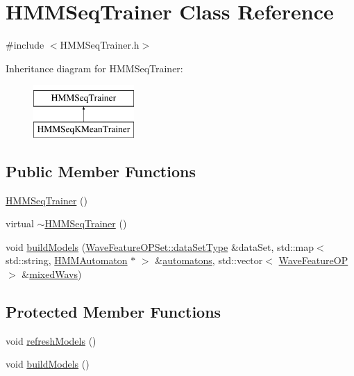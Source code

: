 \hypertarget{class_h_m_m_seq_trainer}{\section{H\+M\+M\+Seq\+Trainer Class Reference}
\label{class_h_m_m_seq_trainer}
}


{\ttfamily \#include $<$H\+M\+M\+Seq\+Trainer.\+h$>$}

Inheritance diagram for H\+M\+M\+Seq\+Trainer\+:\begin{figure}[H]
\begin{center}
\leavevmode
\includegraphics[height=2.000000cm]{class_h_m_m_seq_trainer}
\end{center}
\end{figure}
\subsection*{Public Member Functions}
\begin{DoxyCompactItemize}
\item 
\hyperlink{class_h_m_m_seq_trainer_a7057cd2041fd9a458b1f8e8f930bcaf8}{H\+M\+M\+Seq\+Trainer} ()
\item 
virtual \hyperlink{class_h_m_m_seq_trainer_ade6cb6a33af96d8f610276f86bceee09}{$\sim$\+H\+M\+M\+Seq\+Trainer} ()
\item 
void \hyperlink{class_h_m_m_seq_trainer_a391d1fe69c103b901cabc4c8d44d652c}{build\+Models} (\hyperlink{class_wave_feature_o_p_set_a7145e9463a1fb85ce4c239552bf4e8e0}{Wave\+Feature\+O\+P\+Set\+::data\+Set\+Type} \&data\+Set, std\+::map$<$ std\+::string, \hyperlink{class_h_m_m_automaton}{H\+M\+M\+Automaton} $\ast$ $>$ \&\hyperlink{class_h_m_m_seq_trainer_a70439ad48e64f17d74cdc968effb467f}{automatons}, std\+::vector$<$ \hyperlink{class_wave_feature_o_p}{Wave\+Feature\+O\+P} $>$ \&\hyperlink{class_h_m_m_seq_trainer_a74e6e47e0a794b07e0971cc482ebb5b3}{mixed\+Wavs})
\end{DoxyCompactItemize}
\subsection*{Protected Member Functions}
\begin{DoxyCompactItemize}
\item 
void \hyperlink{class_h_m_m_seq_trainer_afad2c364fd24e88b8e52ceb75c5c602f}{refresh\+Models} ()
\item 
void \hyperlink{class_h_m_m_seq_trainer_a494bbd7510d5f64683c7da573f74c25e}{build\+Models} ()
\end{DoxyCompactItemize}
